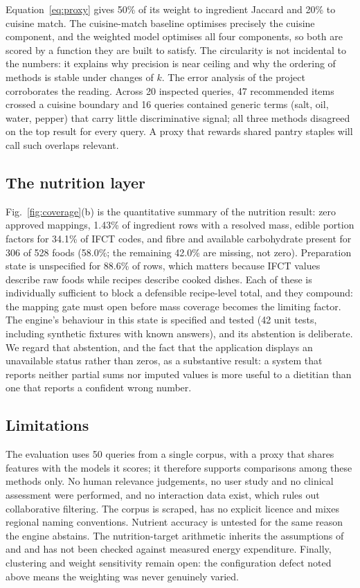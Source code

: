 \documentclass[conference]{IEEEtran}
\begin{document}
Equation~\eqref{eq:proxy} gives 50\% of its weight to ingredient Jaccard and 20\% to
cuisine match. The cuisine-match baseline optimises precisely the cuisine
component, and the weighted model optimises all four components, so both are scored
by a function they are built to satisfy. The circularity is not incidental to the
numbers: it explains why precision is near ceiling and why the ordering of methods
is stable under changes of $k$. The error analysis of the project corroborates the
reading. Across 20 inspected queries, 47 recommended items crossed a cuisine
boundary and 16 queries contained generic terms (salt, oil, water, pepper) that
carry little discriminative signal; all three methods disagreed on the top result
for every query. A proxy that rewards shared pantry staples will call such overlaps
relevant.

\subsection{The nutrition layer}
\label{sec:nutrresults}

Fig.~\ref{fig:coverage}(b) is the quantitative summary of the nutrition result:
zero approved mappings, 1.43\% of ingredient rows with a resolved mass, edible
portion factors for 34.1\% of IFCT codes, and fibre and available carbohydrate
present for 306 of 528 foods (58.0\%; the remaining 42.0\% are missing, not zero).
Preparation state is unspecified for 88.6\% of rows, which matters because IFCT
values describe raw foods while recipes describe cooked dishes. Each of these is
individually sufficient to block a defensible recipe-level total, and they compound:
the mapping gate must open before mass coverage becomes the limiting factor. The
engine's behaviour in this state is specified and tested (42 unit tests, including
synthetic fixtures with known answers), and its abstention is deliberate. We regard
that abstention, and the fact that the application displays an unavailable status
rather than zeros, as a substantive result: a system that reports neither partial
sums nor imputed values is more useful to a dietitian than one that reports a
confident wrong number.

\subsection{Limitations}
\label{sec:limits}

The evaluation uses 50 queries from a single corpus, with a proxy that shares
features with the models it scores; it therefore supports comparisons among these
methods only. No human relevance judgements, no user study and no clinical
assessment were performed, and no interaction data exist, which rules out
collaborative filtering. The corpus is scraped, has no explicit licence and mixes
regional naming conventions. Nutrient accuracy is untested for the same reason the
engine abstains. The nutrition-target arithmetic inherits the assumptions of
\cite{mifflin1990} and \cite{icmrnin2020} and has not been checked against measured
energy expenditure. Finally, clustering and weight sensitivity remain open: the
configuration defect noted above means the weighting was never genuinely varied.
\end{document}
